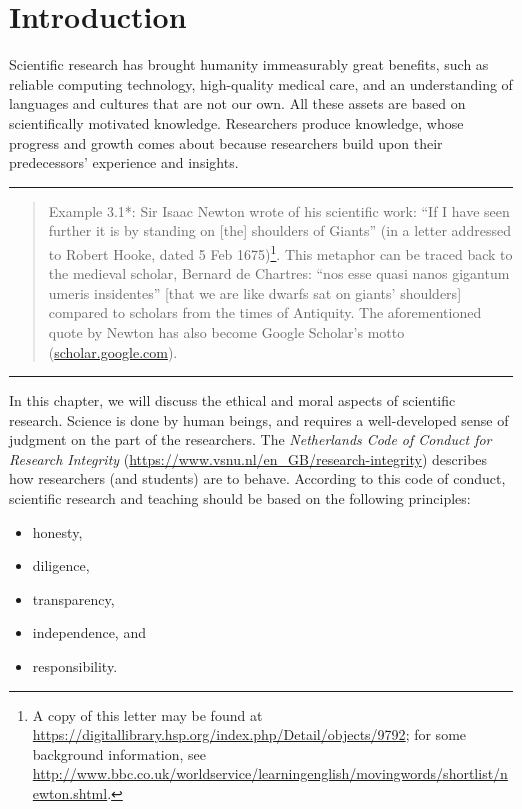 \documentclass[
]{book}
\begin{document}
\section{Introduction}\label{sec:integrity-introduction}

Scientific research has brought humanity immeasurably great benefits, such as reliable computing technology, high-quality medical care, and an understanding of languages and cultures that are not our own. All these assets are based on scientifically motivated knowledge. Researchers produce knowledge, whose progress and growth comes about because researchers build upon their predecessors' experience and insights.

\begin{center}\rule{0.5\linewidth}{0.5pt}\end{center}

\begin{quote}
Example 3.1*: Sir Isaac Newton wrote of his scientific work: ``If I have seen further it is by standing on {[}the{]} shoulders of Giants'' (in a letter addressed to Robert Hooke, dated 5 Feb 1675)\footnote{A copy of this letter may be found at \url{https://digitallibrary.hsp.org/index.php/Detail/objects/9792}; for some background information, see \url{http://www.bbc.co.uk/worldservice/learningenglish/movingwords/shortlist/newton.shtml}.}. This metaphor can be traced back to the medieval scholar, Bernard de Chartres: ``nos esse quasi nanos gigantum umeris insidentes'' {[}that we are like dwarfs sat on giants' shoulders{]} compared to scholars from the times of Antiquity. The aforementioned quote by Newton has also become Google Scholar's motto (\url{scholar.google.com}).
\end{quote}

\begin{center}\rule{0.5\linewidth}{0.5pt}\end{center}

In this chapter, we will discuss the ethical and moral aspects of scientific research. Science is done by human beings, and requires a well-developed sense of judgment on the part of the researchers. The \emph{Netherlands Code of Conduct for Research Integrity} \citep{VSNU18}
(\url{https://www.vsnu.nl/en_GB/research-integrity}) describes how researchers (and students) are to behave. According to this code of conduct, scientific research and teaching should be based on the following principles:

\begin{itemize}
\item
  honesty,
\item
  diligence,
\item
  transparency,
\item
  independence, and
\item
  responsibility.
\end{itemize}
\end{document}
